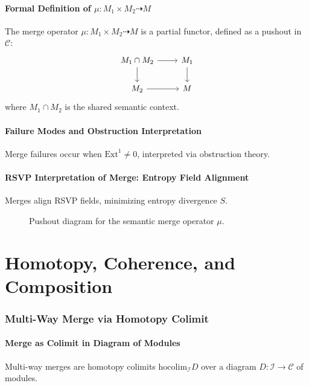 \documentclass[12pt]{article}
\begin{document}
\subsection{Formal Definition of $\mu: M_1 \times M_2 \dashrightarrow M$}
The merge operator $\mu: M_1 \times M_2 \dashrightarrow M$ is a partial functor, defined as a pushout in $\mathcal{C}$:
\[
\begin{tikzcd}
M_1 \cap M_2 \arrow[r] \arrow[d] & M_1 \arrow[d] \\
M_2 \arrow[r] & M
\end{tikzcd}
\]
where $M_1 \cap M_2$ is the shared semantic context.

\subsection{Failure Modes and Obstruction Interpretation}
Merge failures occur when $\text{Ext}^1 \neq 0$, interpreted via obstruction theory.

\subsection{RSVP Interpretation of Merge: Entropy Field Alignment}
Merges align RSVP fields, minimizing entropy divergence $S$.

\begin{figure}[h]
    \centering
    \caption{Pushout diagram for the semantic merge operator $\mu$.}
\end{figure}

\part{Homotopy, Coherence, and Composition}

\section{Multi-Way Merge via Homotopy Colimit}
\subsection{Merge as Colimit in Diagram of Modules}
Multi-way merges are homotopy colimits $\mathrm{hocolim}_\mathcal{I} D$ over a diagram $D: \mathcal{I} \to \mathcal{C}$ of modules.
\end{document}
